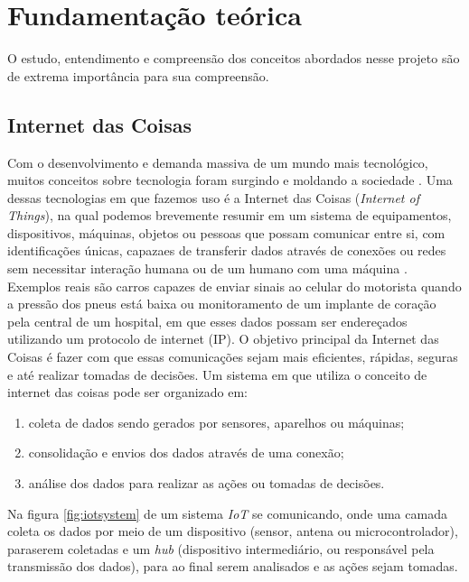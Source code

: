 \documentclass[../../layout.tex]{subfiles}
\begin{document}
\chapter{Fundamentação teórica}
\hspace*{3em}O estudo, entendimento e compreensão dos conceitos abordados nesse projeto são de extrema importância para sua compreensão.

\section{Internet das Coisas}
\hspace*{3em}Com o desenvolvimento e demanda massiva de um mundo mais tecnológico, muitos conceitos sobre tecnologia foram surgindo e moldando a sociedade . Uma dessas tecnologias em que fazemos uso é a Internet das Coisas (\emph{Internet of Things}), na qual podemos brevemente resumir em um sistema de equipamentos, dispositivos, máquinas, objetos ou pessoas que possam comunicar entre si, com identificações únicas, capazaes de transferir dados através de conexões ou redes sem necessitar interação humana ou de um humano com uma máquina \cite{iot}. Exemplos reais são carros capazes de enviar sinais ao celular do motorista quando a pressão dos pneus está baixa ou monitoramento de um implante de coração pela central de um hospital, em que esses dados possam ser endereçados utilizando um protocolo de internet (IP). O objetivo principal da Internet das Coisas é fazer com que essas comunicações sejam mais eficientes, rápidas, seguras e até realizar tomadas de decisões. Um sistema em que utiliza o conceito de internet das coisas pode ser organizado em:
\begin{enumerate}[label=\alph*)]
\itemsep0em
\item coleta de dados sendo gerados por sensores, aparelhos ou máquinas;
\item consolidação e envios dos dados através de uma conexão;
\item análise dos dados para realizar as ações ou tomadas de decisões.
\end{enumerate}

\hspace*{3em} Na figura \ref{fig:iotsystem} de um sistema \emph{IoT} se comunicando, onde uma camada coleta os dados por meio de um dispositivo (sensor, antena ou microcontrolador), paraserem coletadas e um \emph{hub} (dispositivo intermediário, ou responsável pela transmissão dos dados), para ao final serem analisados e as ações sejam tomadas.
\end{document}
